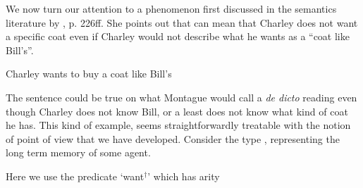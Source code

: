 We now turn our attention to a phenomenon first discussed in the
semantics literature by \cite{Fodor1970}, p. 226ff.  She points out
that \nexteg{} can mean that Charley does not want a specific coat
even if Charley would not describe what he wants as a ``coat like
Bill's''.  
\begin{ex} 
Charley wants to buy a coat like Bill's 
\end{ex}   
The sentence could be true on what Montague would call a
\textit{de dicto} reading even though Charley does not know Bill, or a
least does not know what kind of coat he has.  This kind of example,
seems straightforwardly treatable with the notion of point of view
that we have developed.  Consider the type \nexteg{}, representing the
long term memory of some agent.
\newsavebox{\desires}
\newsavebox{\despov}
\begin{ex} 
\end{ex} 
Here we use the predicate `want$^\dagger$' which has arity
